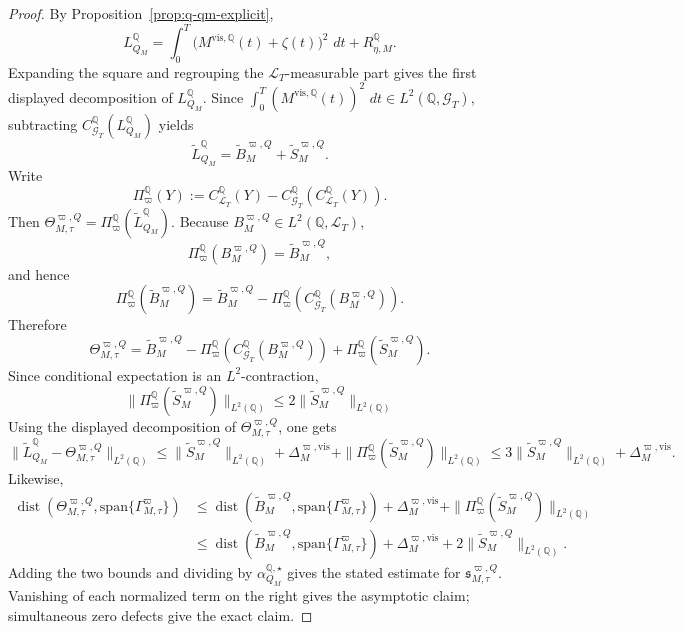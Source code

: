 \documentclass[11pt,a4paper]{amsart}
\theoremstyle{plain}
\theoremstyle{definition}
\theoremstyle{remark}
\DeclareMathOperator{\dist}{dist}
\newcommand{\QQ}{\mathbb{Q}}
\newcommand{\cG}{\mathcal{G}}
\newcommand{\cL}{\mathcal{L}}
\newcommand{\dd}{\,d}
\begin{document}
\begin{proof}
By Proposition~\ref{prop:q-qm-explicit},
\[
        L_{Q_M}^\QQ
        =
        \int_0^T \bigl(M^{\mathrm{vis},\QQ}(t)+\zeta(t)\bigr)^2\,\dd t
        +
        R_{\eta,M}^\QQ.
\]
Expanding the square and regrouping the \(\cL_T\)-measurable part gives the first displayed
decomposition of \(L_{Q_M}^\QQ\).  Since
\(\int_0^T(M^{\mathrm{vis},\QQ}(t))^2\,\dd t\in L^2(\QQ,\cG_T)\), subtracting
\(C_{\cG_T}^\QQ(L_{Q_M}^\QQ)\) yields
\[
        \widetilde L_{Q_M}^\QQ
        =
        \widetilde B_{M}^{\varpi,Q}
        +
        \widetilde S_{M}^{\varpi,Q}.
\]
Write
\[
        \Pi_\varpi^\QQ(Y)
        :=
        C_{\cL_T}^\QQ(Y)
        -
        C_{\cG_T}^\QQ\!\left(C_{\cL_T}^\QQ(Y)\right).
\]
Then \(\Theta_{M,\tau}^{\varpi,Q}=\Pi_\varpi^\QQ(\widetilde L_{Q_M}^\QQ)\).  Because
\(B_{M}^{\varpi,Q}\in L^2(\QQ,\cL_T)\),
\[
        \Pi_\varpi^\QQ(B_{M}^{\varpi,Q})
        =
        \widetilde B_{M}^{\varpi,Q},
\]
and hence
\[
        \Pi_\varpi^\QQ(\widetilde B_{M}^{\varpi,Q})
        =
        \widetilde B_{M}^{\varpi,Q}
        -
        \Pi_\varpi^\QQ\!\left(
                C_{\cG_T}^\QQ(B_{M}^{\varpi,Q})
        \right).
\]
Therefore
\[
        \Theta_{M,\tau}^{\varpi,Q}
        =
        \widetilde B_{M}^{\varpi,Q}
        -
        \Pi_\varpi^\QQ\!\left(
                C_{\cG_T}^\QQ(B_{M}^{\varpi,Q})
        \right)
        +
        \Pi_\varpi^\QQ(\widetilde S_{M}^{\varpi,Q}).
\]
Since conditional expectation is an \(L^2\)-contraction,
\[
        \|\Pi_\varpi^\QQ(\widetilde S_{M}^{\varpi,Q})\|_{L^2(\QQ)}
        \le
        2\|\widetilde S_{M}^{\varpi,Q}\|_{L^2(\QQ)}
\]
Using the displayed decomposition of \(\Theta_{M,\tau}^{\varpi,Q}\), one gets
\[
        \|\widetilde L_{Q_M}^\QQ-\Theta_{M,\tau}^{\varpi,Q}\|_{L^2(\QQ)}
        \le
        \|\widetilde S_{M}^{\varpi,Q}\|_{L^2(\QQ)}
        +
        \Delta_{M}^{\varpi,\mathrm{vis}}
        +
        \|\Pi_\varpi^\QQ(\widetilde S_{M}^{\varpi,Q})\|_{L^2(\QQ)}
        \le
        3\|\widetilde S_{M}^{\varpi,Q}\|_{L^2(\QQ)}
        +
        \Delta_{M}^{\varpi,\mathrm{vis}}.
\]
Likewise,
\[
\begin{aligned}
        \dist\!\left(
                \Theta_{M,\tau}^{\varpi,Q},
                \mathrm{span}\{\Gamma_{M,\tau}^\varpi\}
        \right)
        &\le
        \dist\!\left(
                \widetilde B_{M}^{\varpi,Q},
                \mathrm{span}\{\Gamma_{M,\tau}^\varpi\}
        \right)
        +
        \Delta_{M}^{\varpi,\mathrm{vis}}
        +
        \|\Pi_\varpi^\QQ(\widetilde S_{M}^{\varpi,Q})\|_{L^2(\QQ)} \\
        &\le
        \dist\!\left(
                \widetilde B_{M}^{\varpi,Q},
                \mathrm{span}\{\Gamma_{M,\tau}^\varpi\}
        \right)
        +
        \Delta_{M}^{\varpi,\mathrm{vis}}
        +
        2\|\widetilde S_{M}^{\varpi,Q}\|_{L^2(\QQ)}.
\end{aligned}
\]
Adding the two bounds and dividing by \(\alpha_{Q_M}^{\QQ,\star}\) gives the stated estimate for
\(\mathfrak s_{M,\tau}^{\varpi,Q}\).  Vanishing of each normalized term on the right gives the
asymptotic claim; simultaneous zero defects give the exact claim.
\end{proof}
\end{document}
